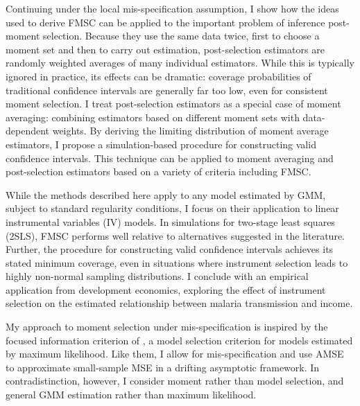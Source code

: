 Continuing under the local mis-specification assumption, I show how the ideas used to derive FMSC can be applied to the important problem of inference post-moment selection. 
Because they use the same data twice, first to choose a moment set and then to carry out estimation, post-selection estimators are randomly weighted averages of many individual estimators.
While this is typically ignored in practice, its effects can be dramatic: coverage probabilities of traditional confidence intervals are generally far too low, even for consistent moment selection. 
I treat post-selection estimators as a special case of moment averaging: combining estimators based on different moment sets with data-dependent weights.
By deriving the limiting distribution of moment average estimators, I propose a simulation-based procedure for constructing valid confidence intervals. This technique can be applied to moment averaging and post-selection estimators based on a variety of criteria including FMSC. 

While the methods described here apply to any model estimated by GMM, subject to standard regularity conditions, I focus on their application to linear instrumental variables (IV) models. 
In simulations for two-stage least squares (2SLS), FMSC performs well relative to alternatives suggested in the literature. 
Further, the procedure for constructing valid confidence intervals achieves its stated minimum coverage, even in situations where instrument selection leads to highly non-normal sampling distributions. 
I conclude with an empirical application from development economics, exploring the effect of instrument selection on the estimated relationship between malaria transmission and income.



My approach to moment selection under mis-specification is inspired by the focused information criterion of \citet{ClaeskensHjort2003}, a model selection criterion for models estimated by maximum likelihood. 
Like them, I allow for mis-specification and use AMSE to approximate small-sample MSE in a drifting asymptotic framework. 
In contradistinction, however, I consider moment rather than model selection, and general GMM estimation rather than maximum likelihood.
 
